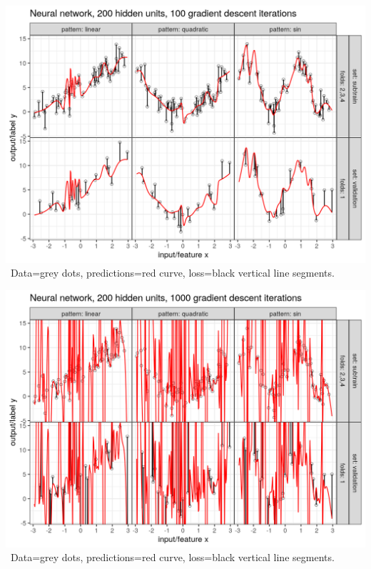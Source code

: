 \begin{frame}
  \includegraphics[width=\textwidth]{figure-overfitting-pred-units=200-maxit=100.png}
\
Data=grey dots, predictions=red curve, loss=black vertical line segments.
\end{frame}


\begin{frame}
  \includegraphics[width=\textwidth]{figure-overfitting-pred-units=200-maxit=1000.png}
\
Data=grey dots, predictions=red curve, loss=black vertical line segments.
\end{frame}


